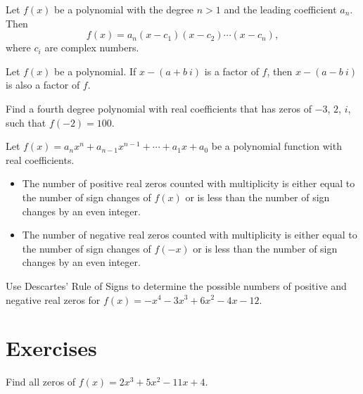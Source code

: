 \newpage

\begin{theorem}
  Let $f(x)$ be a polynomial with the degree $n>1$ and the leading coefficient $a_n$. Then
  \[f(x)=a_n(x-c_1)(x-c_2)\cdots(x-c_n),\]
  where $c_i$ are complex numbers.
\end{theorem}

\begin{theorem}
  Let $f(x)$ be a polynomial. If $x-(a+b~i)$ is a factor of $f$, then $x-(a-b~i)$ is also a factor of $f$. 
\end{theorem}

\begin{example}
  Find a fourth degree polynomial with real coefficients that has zeros of $-3$, $2$, $i$, such that $f(-2)=100$.
\end{example}

\begin{theorem}
  Let $f(x)=a_nx^n+a_{n-1}x^{n-1}+\cdots+a_1x+a_0$ be a polynomial function with real coefficients.

  \begin{itemize}
    \item The number of positive real zeros counted with multiplicity is either equal to the number of sign changes of $f(x)$ or is less than the number of sign changes by an even integer.
    \item The number of negative real zeros counted with multiplicity is either equal to the number of sign changes of $f(-x)$ or is less than the number of sign changes by an even integer.
  \end{itemize}
\end{theorem}

\begin{example}
  Use Descartes' Rule of Signs to determine the possible numbers of positive and negative real zeros for $f(x)=-x^4-3x^3+6x^2-4x-12$.
\end{example}

\newpage
\section*{Exercises}

\begin{exercise}
  Find all zeros of $f(x)=2x^3+5x^2-11x+4$.
\end{exercise}


